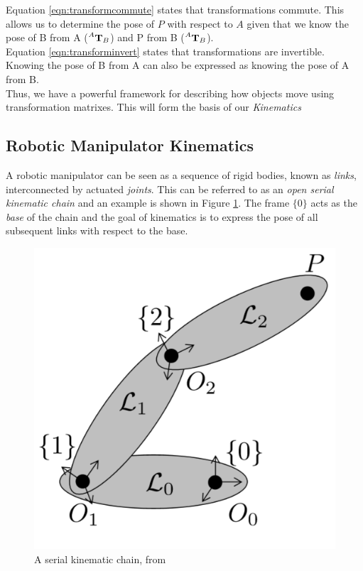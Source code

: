 \documentclass{UoNMCHA}
\numberwithin{equation}{section}
\begin{document}
Equation \ref{eqn:transformcommute} states that transformations commute. This allows us to determine the pose of $P$ with respect to $A$ given that we know the pose of B from A ($\prescript{A}{}{\mathbf{T}}_{B}$) and P from B ($\prescript{A}{}{\mathbf{T}}_{B}$).\\
Equation \ref{eqn:transforminvert} states that transformations are invertible. Knowing the pose of B from A can also be expressed as knowing the pose of A from B. \\

Thus, we have a powerful framework for describing how objects move using transformation matrixes. This will form the basis of our \textit{Kinematics}


\subsection{Robotic Manipulator Kinematics}

A robotic manipulator can be seen as a sequence of rigid bodies, known as \textit{links}, interconnected by actuated \textit{joints}. This can be referred to as an \textit{open serial kinematic chain} and an example is shown in Figure \ref{fig:JointsRobotArm}. The frame $\{0\}$ acts as the \textit{base} of the chain and the goal of kinematics is to express the pose of all subsequent links with respect to the base. \\

\begin{figure}[hh]
	\begin{center}
		\includegraphics[scale=0.5]{Figures/JointsRobotArm}
		\caption{A serial kinematic chain, from \citep{RentonManipulatorDynamics}}
		\label{fig:JointsRobotArm}
	\end{center}
\end{figure}
\end{document}
